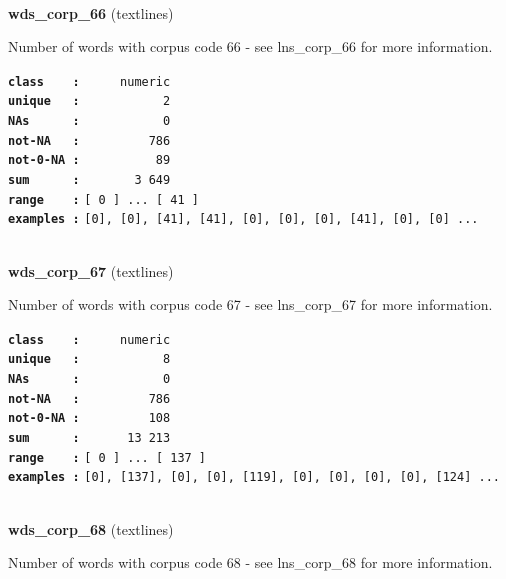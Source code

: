 \documentclass[]{article}
\begin{document}
~

\textbf{wds\_corp\_66} (textlines)

Number of words with corpus code 66 - see lns\_corp\_66 for more
information.

\textbf{\texttt{class\ \ \ \ :}} \texttt{~~~~~numeric}\\
\textbf{\texttt{unique\ \ \ :}} \texttt{~~~~~~~~~~~2}\\
\textbf{\texttt{NAs\ \ \ \ \ \ :}} \texttt{~~~~~~~~~~~0}\\
\textbf{\texttt{not-NA\ \ \ :}} \texttt{~~~~~~~~~786}\\
\textbf{\texttt{not-0-NA\ :}} \texttt{~~~~~~~~~~89}\\
\textbf{\texttt{sum\ \ \ \ \ \ :}} \texttt{~~~~~~~3~649}\\
\textbf{\texttt{range\ \ \ \ :}}
\texttt{{[}\ 0\ {]}\ ...\ {[}\ 41\ {]}}\\
\textbf{\texttt{examples\ :}}
\texttt{{[}0{]},\ {[}0{]},\ {[}41{]},\ {[}41{]},\ {[}0{]},\ {[}0{]},\ {[}0{]},\ {[}41{]},\ {[}0{]},\ {[}0{]}\ ...}\\

~

\textbf{wds\_corp\_67} (textlines)

Number of words with corpus code 67 - see lns\_corp\_67 for more
information.

\textbf{\texttt{class\ \ \ \ :}} \texttt{~~~~~numeric}\\
\textbf{\texttt{unique\ \ \ :}} \texttt{~~~~~~~~~~~8}\\
\textbf{\texttt{NAs\ \ \ \ \ \ :}} \texttt{~~~~~~~~~~~0}\\
\textbf{\texttt{not-NA\ \ \ :}} \texttt{~~~~~~~~~786}\\
\textbf{\texttt{not-0-NA\ :}} \texttt{~~~~~~~~~108}\\
\textbf{\texttt{sum\ \ \ \ \ \ :}} \texttt{~~~~~~13~213}\\
\textbf{\texttt{range\ \ \ \ :}}
\texttt{{[}\ 0\ {]}\ ...\ {[}\ 137\ {]}}\\
\textbf{\texttt{examples\ :}}
\texttt{{[}0{]},\ {[}137{]},\ {[}0{]},\ {[}0{]},\ {[}119{]},\ {[}0{]},\ {[}0{]},\ {[}0{]},\ {[}0{]},\ {[}124{]}\ ...}\\

~

\textbf{wds\_corp\_68} (textlines)

Number of words with corpus code 68 - see lns\_corp\_68 for more
information.
\end{document}
